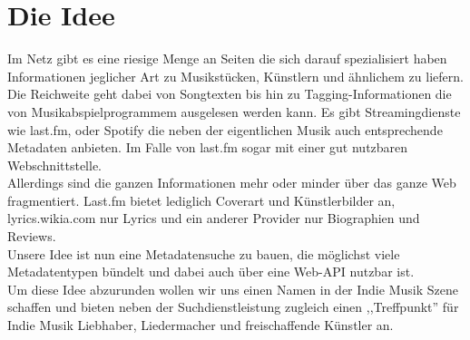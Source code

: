 
\chapter{Die Idee}
Im Netz gibt es eine riesige Menge an Seiten die sich darauf spezialisiert
haben Informationen jeglicher Art zu Musikstücken, Künstlern und ähnlichem zu
liefern.
\\
Die Reichweite geht dabei von Songtexten bis hin zu Tagging-Informationen die von
Musikabspielprogrammem ausgelesen werden kann. Es gibt Streamingdienste wie last.fm,
oder Spotify die neben der eigentlichen Musik auch entsprechende Metadaten anbieten. 
Im Falle von last.fm sogar mit einer gut nutzbaren Webschnittstelle.
\\
Allerdings sind die ganzen Informationen mehr oder minder über das ganze Web
fragmentiert. Last.fm bietet lediglich Coverart und Künstlerbilder an, 
lyrics.wikia.com nur Lyrics und ein anderer Provider nur Biographien und
Reviews.
\\
Unsere Idee ist nun eine Metadatensuche zu bauen, die möglichst viele
Metadatentypen bündelt und dabei auch über eine Web-API nutzbar ist.
\\
Um diese Idee abzurunden wollen wir uns einen Namen in der Indie Musik Szene
schaffen und bieten neben der Suchdienstleistung zugleich einen ,,Treffpunkt'' für Indie
Musik Liebhaber, Liedermacher und freischaffende Künstler an.
